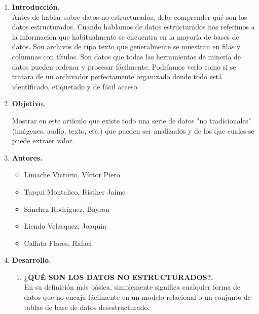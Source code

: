 \documentclass[12pt,a4paper,oneside]{book}
\begin{document}
	
	\begin{enumerate}
		
		\item \textbf{Introducci\'on.} \\
		
				Antes de hablar sobre datos no estructurados, debe comprender qué son los datos estructurados. Cuando hablamos de datos estructurados nos referimos a la información que habitualmente se encuentra en la mayoría de bases de datos. Son archivos de tipo texto que generalmente se muestran en filas y columnas con títulos. Son datos que todas las herramientas de minería de datos pueden ordenar y procesar fácilmente. Podríamos verlo como si se tratara de un archivador perfectamente organizado donde todo está identificado, etiquetado y de fácil acceso.\\
		
		
		\item \textbf{Objetivo.}
		
				Mostrar en este artículo que existe todo una serie de datos "no tradicionales"(imágenes, audio, texto, etc.) que pueden ser analizados y de los que cuales se puede extraer valor. \\
				
				
		\item \textbf{Autores.}
		
				\begin{itemize}
					
					\item	Limache Victorio, V\'ictor Piero 
					\item	Tarqui Montalico, Risther Jaime 
					\item	S\'anchez Rodr\'iguez, Bayron 
					\item	Liendo Velasquez, Joaqu\'in 
					\item	Callata Flores, Rafael 
					
				\end{itemize}
			
		\item \textbf{Desarrollo.}
				\begin{enumerate}
					\item \textbf{¿QUÉ SON LOS DATOS NO ESTRUCTURADOS?.} \\
					
					En su definición más básica, simplemente significa cualquier forma de datos que no encaja fácilmente en un modelo relacional o un conjunto de tablas de base de datos desestructurado.\\
					

\end{enumerate}
\end{enumerate}
\end{document}
